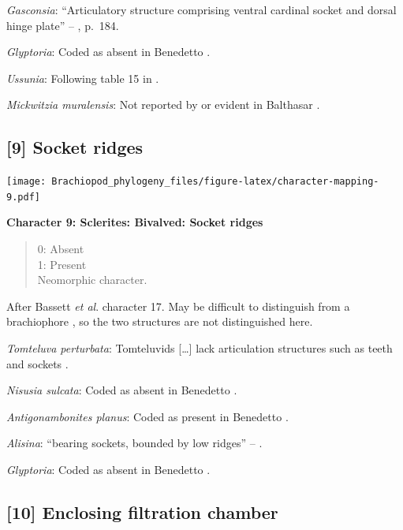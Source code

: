 \documentclass[]{book}
\theoremstyle{definition}
\theoremstyle{definition}
\theoremstyle{definition}
\theoremstyle{remark}
\begin{document}
\emph{Gasconsia}: ``Articulatory structure comprising ventral cardinal
socket and dorsal hinge plate'' --
\citet{Williams2000BrachiopodaLinguliformea}, p.~184.

\emph{Glyptoria}: Coded as absent in Benedetto
\citeyearpar{Benedetto2009iChaniella}.

\emph{Ussunia}: Following table 15 in
\citet{Williams2000BrachiopodaLinguliformea}.

\emph{Mickwitzia muralensis}: Not reported by or evident in Balthasar
\citeyearpar{Balthasar2004Shellstructure}.

\hypertarget{socket-ridges}{%
\subsection*{{[}9{]} Socket ridges}\label{socket-ridges}}

\texttt{[image: Brachiopod\_phylogeny\_files/figure-latex/character-mapping-9.pdf]}

\textbf{Character 9: Sclerites: Bivalved: Socket ridges}

\begin{quote}
0: Absent\\
1: Present\\
Neomorphic character.
\end{quote}

After Bassett \emph{et al}.
\citeyearpar{Bassett2001Functionalmorphology} character 17. May be
difficult to distinguish from a brachiophore \citep[see Fig 323
in][]{Williams1997BrachiopodaRevised}, so the two structures are not
distinguished here.

\emph{Tomteluva perturbata}: Tomteluvids {[}\ldots{}{]} lack
articulation structures such as teeth and sockets
\citep{Streng2016Anew}.

\emph{Nisusia sulcata}: Coded as absent in Benedetto
\citeyearpar{Benedetto2009iChaniella}.

\emph{Antigonambonites planus}: Coded as present in Benedetto
\citeyearpar{Benedetto2009iChaniella}.

\emph{Alisina}: ``bearing sockets, bounded by low ridges'' --
\citet{Williams2000BrachiopodaLinguliformea}.

\emph{Glyptoria}: Coded as absent in Benedetto
\citeyearpar{Benedetto2009iChaniella}.

\hypertarget{enclosing-filtration-chamber}{%
\subsection*{{[}10{]} Enclosing filtration
chamber}\label{enclosing-filtration-chamber}}
\end{document}
